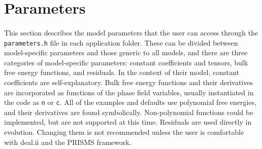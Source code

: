 \documentclass[11pt]{article} %
\begin{document}
\section{Parameters}
\paragraph{}
This section describes the model parameters that the user can access through the \texttt{parameters.h} file in each application folder.  These can be divided between model-specific parameters and those generic to all models, and there are three categories of model-specific parameters: constant coefficients and tensors, bulk free energy functions, and residuals.  In the context of their model, constant coefficients are self-explanatory.  Bulk free energy functions and their derivatives are incorporated as functions of the phase field variables, usually instantiated in the code as \texttt{n} or \texttt{c}.  All of the examples and defaults use polynomial free energies, and their derivatives are found symbolically.  Non-polynomial functions could be implemented, but are not supported at this time.  Residuals are used directly in evolution.  Changing them is not recommended unless the user is comfortable with deal.ii and the PRISMS framework.
\end{document}
